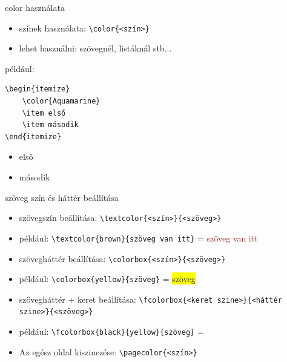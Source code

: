 \documentclass[aspectratio=1610, dvipsnames, xcolor=table]{beamer}
\begin{document}
    \begin{frame}[fragile]{color használata}
        \begin{minipage}{0.6\textwidth}
            \begin{itemize}            
                \item {} színek használata: \verb!\color{<szín>}!
                \item {} lehet használni: szövegnél, listáknál stb...    
            \end{itemize}
        \end{minipage}
        \begin{minipage}{0.35\textwidth}
            
                 például:
                 \begin{verbatim}\begin{itemize}
    \color{Aquamarine}
    \item első
    \item második
\end{itemize}\end{verbatim}
                  \begin{itemize}
                    \color{Aquamarine}
                    \item első
                    \item második
                \end{itemize}
        \end{minipage}
    \end{frame}
       
    \begin{frame}[fragile]{szöveg szín és háttér beállítása}
        
        \begin{itemize}            
            \item {} szövegszín beállítása: \verb!\textcolor{<szín>}{<szöveg>}!
            \item {} például: \verb!\textcolor{brown}{szöveg van itt}! = \textcolor{brown}{szöveg van itt}
            \item {} szövegháttér beállítása: \verb!\colorbox{<szín>}{<szöveg>}!
            \item {} például: \verb!\colorbox{yellow}{szöveg}! = \colorbox{yellow}{szöveg}
            \item {} szövegháttér + keret beállítása: \verb!\fcolorbox{<keret szine>}{<háttér szine>}{<szöveg>}!
            \item {} például: \verb!\fcolorbox{black}{yellow}{szöveg}! = 
            \item {} Az egész oldal kiszinezése: \verb!\pagecolor{<szín>}!
        \end{itemize}
    \end{frame}
    
\end{document}

